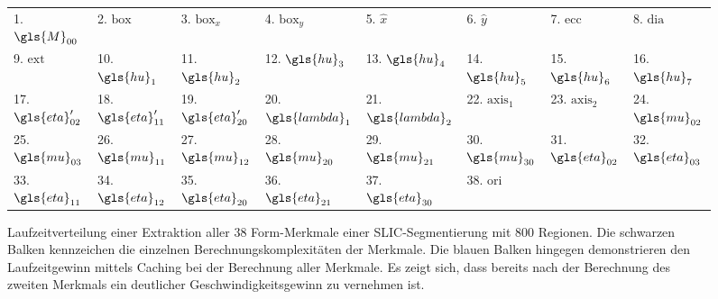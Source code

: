 \begin{figure}[t]
\begin{tabular}{llllllll}
  \toprule
  1. $\gls{M}_{00}$ & 2. $\mathrm{box}$ & 3. $\mathrm{box}_x$ & 4. $\mathrm{box}_y$ & 5. $\hat{x}$ & 6. $\hat{y}$ & 7. $\mathrm{ecc}$ & 8. $\mathrm{dia}$\\
  9. $\mathrm{ext}$ & 10. $\gls{hu}_1$ & 11. $\gls{hu}_{2}$ & 12. $\gls{hu}_{3}$ & 13. $\gls{hu}_{4}$ & 14. $\gls{hu}_{5}$ & 15. $\gls{hu}_{6}$ & 16. $\gls{hu}_{7}$\\
  17. $\gls{eta}^{\prime}_{02}$ & 18. $\gls{eta}^{\prime}_{11}$ & 19. $\gls{eta}^{\prime}_{20}$ & 20. $\gls{lambda}_1$ & 21. $\gls{lambda}_2$ & 22. $\mathrm{axis}_1$ & 23. $\mathrm{axis}_2$ & 24. $\gls{mu}_{02}$\\
  25. $\gls{mu}_{03}$ & 26. $\gls{mu}_{11}$ & 27. $\gls{mu}_{12}$ & 28. $\gls{mu}_{20}$ & 29. $\gls{mu}_{21}$ & 30. $\gls{mu}_{30}$ & 31. $\gls{eta}_{02}$ & 32. $\gls{eta}_{03}$\\
  33. $\gls{eta}_{11}$ & 34. $\gls{eta}_{12}$ & 35. $\gls{eta}_{20}$ & 36. $\gls{eta}_{21}$ & 37. $\gls{eta}_{30}$ & 38. $\mathrm{ori}$ & & \\
  \bottomrule
\end{tabular}

\caption[Laufzeitverteilung einer Merkmalsextraktion]{Laufzeitverteilung einer Extraktion aller $38$ Form-Merkmale einer \gls{SLIC}-Segmentierung mit $800$ Regionen.
Die schwarzen Balken kennzeichen die einzelnen Berechnungskomplexitäten der Merkmale.
Die blauen Balken hingegen demonstrieren den Laufzeitgewinn mittels Caching bei der Berechnung aller Merkmale.
Es zeigt sich, dass bereits nach der Berechnung des zweiten Merkmals ein deutlicher Geschwindigkeitsgewinn zu vernehmen ist.}
\label{fig:merkmals_caching}
\end{figure}
